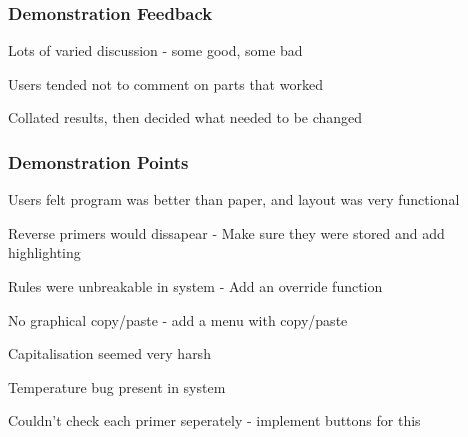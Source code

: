   
\begin{frame}
\frametitle{Demonstration Feedback}
\item Lots of varied discussion - some good, some bad
\item Users tended not to comment on parts that worked
\item Collated results, then decided what needed to be changed
\end{frame}    

\begin{frame}
\frametitle{Demonstration Points}
\item Users felt program was better than paper, and layout was very functional
\item Reverse primers would dissapear - Make sure they were stored and add highlighting
\item Rules were unbreakable in system - Add an override function
\item No graphical copy/paste - add a menu with copy/paste
\item Capitalisation seemed very harsh
\item Temperature bug present in system
\item Couldn't check each primer seperately - implement buttons for this

\end{frame}    

